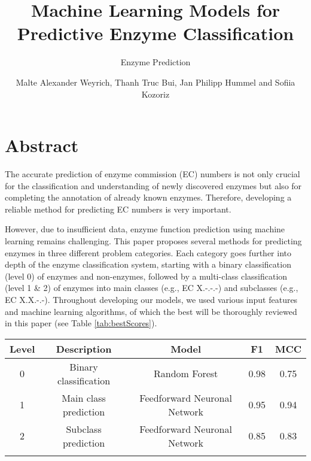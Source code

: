 \documentclass{bioinfo}
\begin{document}

\subtitle{Enzyme Prediction}

\title[]{Machine Learning Models for Predictive Enzyme Classification}
\author[]{Malte Alexander Weyrich, Thanh Truc Bui, Jan Philipp Hummel
and  Sofiia Kozoriz}

\address{}
\corresp{}
\history{}
\editor{}

\abstract{}

\maketitle


\section{Abstract}
The accurate prediction of enzyme commission (EC) numbers is not only crucial for 
the classification and understanding of newly discovered enzymes but also for completing the annotation of already known enzymes.
Therefore, developing a reliable method for predicting EC numbers is very important.

However, due to insufficient data, enzyme function prediction using machine learning remains challenging.
This paper proposes several methods for predicting enzymes in three different problem categories. Each category goes further into depth
of the enzyme classification system, starting with a binary classification (level 0) of enzymes and non-enzymes, followed by a multi-class classification (level 1 \& 2) of enzymes into main classes (e.g., EC X.-.-.-) and subclasses (e.g., EC X.X.-.-).
Throughout developing our models, we used various input features and machine learning algorithms, of which the best will be thoroughly reviewed in this paper (see Table \ref{tab:bestScores}).

\begin{table}[!htbp]
 {\begin{tabular}{@{}ccccc@{}}\toprule 
		Level & Description & Model & F1 & MCC \\\midrule
		0 & Binary classification & Random Forest & 0.98 & 0.75 \\
		1 & Main class prediction &  Feedforward Neuronal Network & 0.95 & 0.94 \\
		2 & Subclass prediction&  Feedforward Neuronal Network & 0.85 & 0.83 \\\botrule
\end{tabular}}{}
\end{table}
\end{document}
